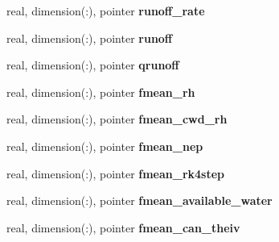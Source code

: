 \begin{DoxyCompactItemize}
\item 
\hypertarget{structed__state__vars_1_1sitetype_a3a7e9f47091d09b4c26dcb81e3fdcde6}{
real, dimension(:), pointer {\bfseries runoff\_\-rate}}
\label{structed__state__vars_1_1sitetype_a3a7e9f47091d09b4c26dcb81e3fdcde6}

\item 
\hypertarget{structed__state__vars_1_1sitetype_abf0cfa267e079c2b3a56b9d78893db5d}{
real, dimension(:), pointer {\bfseries runoff}}
\label{structed__state__vars_1_1sitetype_abf0cfa267e079c2b3a56b9d78893db5d}

\item 
\hypertarget{structed__state__vars_1_1sitetype_a35993fdbbc34ec2eadcf3a2b55c2364a}{
real, dimension(:), pointer {\bfseries qrunoff}}
\label{structed__state__vars_1_1sitetype_a35993fdbbc34ec2eadcf3a2b55c2364a}

\item 
\hypertarget{structed__state__vars_1_1sitetype_acffaa71d62b183e3910b7a32d7f14707}{
real, dimension(:), pointer {\bfseries fmean\_\-rh}}
\label{structed__state__vars_1_1sitetype_acffaa71d62b183e3910b7a32d7f14707}

\item 
\hypertarget{structed__state__vars_1_1sitetype_af4d30f145b253324aaa7bded888893e9}{
real, dimension(:), pointer {\bfseries fmean\_\-cwd\_\-rh}}
\label{structed__state__vars_1_1sitetype_af4d30f145b253324aaa7bded888893e9}

\item 
\hypertarget{structed__state__vars_1_1sitetype_ac26b6615ca99931f24332c12f7204140}{
real, dimension(:), pointer {\bfseries fmean\_\-nep}}
\label{structed__state__vars_1_1sitetype_ac26b6615ca99931f24332c12f7204140}

\item 
\hypertarget{structed__state__vars_1_1sitetype_ad96c0883d5529c5c7b24b3e7ea188503}{
real, dimension(:), pointer {\bfseries fmean\_\-rk4step}}
\label{structed__state__vars_1_1sitetype_ad96c0883d5529c5c7b24b3e7ea188503}

\item 
\hypertarget{structed__state__vars_1_1sitetype_ac1c3a71f868b9701c9dbc08ec5dd4684}{
real, dimension(:), pointer {\bfseries fmean\_\-available\_\-water}}
\label{structed__state__vars_1_1sitetype_ac1c3a71f868b9701c9dbc08ec5dd4684}

\item 
\hypertarget{structed__state__vars_1_1sitetype_aa7ad98df618a1d0c4f3a24c87d3c81f5}{
real, dimension(:), pointer {\bfseries fmean\_\-can\_\-theiv}}
\label{structed__state__vars_1_1sitetype_aa7ad98df618a1d0c4f3a24c87d3c81f5}


\end{DoxyCompactItemize}
